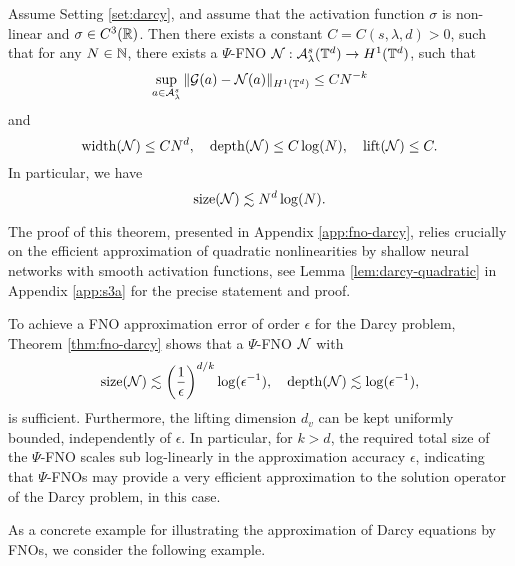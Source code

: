 \documentclass[reqno,a4paper]{amsart}
\begin{document}
\begin{theorem} \label{thm:fno-darcy}
Assume Setting \ref{set:darcy}, and assume that the activation function $\sigma$ is non-linear and $\sigma \in C^3(\mathbb{R})$. Then there exists a constant $C = C(s,\lambda,d)>0$, such that for any $N\in \mathbb{N}$, there exists a $\Psi$-FNO $\mathcal{N}: \mathcal{A}_\lambda^s(\mathbb{T}^d) \to H^1(\mathbb{T}^d)$, such that 
\[
\sup_{a\in \mathcal{A}_{\lambda}^s} 
\Vert \mathcal{G}(a) - \mathcal{N}(a) \Vert_{H^1(\mathbb{T}^d)}
\le C N^{-k}
\]
and
\[
\mathrm{width}(\mathcal{N}) \le C N^d
, 
\quad 
\mathrm{depth}(\mathcal{N}) \le C\log(N)
,
\quad 
\mathrm{lift}(\mathcal{N}) \le C.
\]
In particular, we have
\[
\mathrm{size}(\mathcal{N}) \lesssim N^d \log(N).
\]
\end{theorem}
The proof of this theorem, presented in Appendix \ref{app:fno-darcy}, relies crucially on the efficient approximation of quadratic nonlinearities by shallow neural networks with smooth activation functions, see Lemma \ref{lem:darcy-quadratic} in Appendix \ref{app:s3a} for the precise statement and proof. 
\begin{remark} \label{rmk:darcy-orderest}
To achieve a FNO approximation error of order $\epsilon$ for the Darcy problem, Theorem \ref{thm:fno-darcy} shows that a $\Psi$-FNO $\mathcal{N}$ with
\begin{equation}
    \label{eq:darcycomp}
\mathrm{size}(\mathcal{N}) \lesssim \left( \frac{1}{\epsilon} \right)^{d/k} \log(\epsilon^{-1}),
\quad
\mathrm{depth}(\mathcal{N}) \lesssim \log(\epsilon^{-1}),
\end{equation}
is sufficient. Furthermore, the lifting dimension $d_v$ can be kept uniformly bounded, independently of $\epsilon$. In particular, for $k>d$, the required total size of the $\Psi$-FNO scales sub log-linearly in the approximation accuracy $\epsilon$, indicating that $\Psi$-FNOs may provide a very efficient approximation to the solution operator of the Darcy problem, in this case.
\end{remark}
As a concrete example for illustrating the approximation of Darcy equations by FNOs, we consider the following example.
\end{document}
